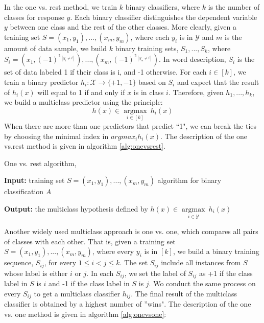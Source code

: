 In the one vs. rest method,   we train $k$ binary classifiers,  where $k$ is the number of classes for response $y$. Each binary classifier distinguishes the dependent variable $y$ between one class and the rest of the other classes.  More clearly,   given a training set  $S=(x_1, y_1), ...,  (x_m, y_m)$,  where each $y_i$ is in $\mathcal{Y}$ and $m$ is the amount of data sample,  we build $k$ binary training sets,  $S_1, ..., S_k$,  where $S_i=(x_1, (-1)^{\mathds{1}_[y_1\neq i]}), ..., (x_m, (-1)^{\mathds{1}_[y_m\neq i]}).$ In word description,  
$S_i$ is the set of data labeled 1 if their class is i,  and -1 otherwise. For each $i \in [k]$,  we train a binary predictor $h_i:\mathcal{X}\rightarrow \{+1, -1\}$ based on $S_i$ and expect that the result of $h_i(x)$ will equal to 1 if and only if $x$ is in class $i$.  Therefore,  given $h_1, ..., h_k$,  we build a multiclass predictor using the principle: 
\begin{equation}
h(x) \in\underset{i\in [k]}{\operatorname{argmax}}\ h_i(x)
\end{equation}
When there are more than one predictors that predict ``1",  we can break the ties by choosing the minimal index in $argmax_i h_i(x)$. The description of the one vs.rest method is given in algorithm \ref{alg:onevsrest}.


\begin{algorithm}[H]
	\caption{One vs. rest algorithm, }  \label{alg:onevsrest}
	\nl \textbf{Input:}\;
	\nl training set $S=(x_1, y_1), ..., (x_m, y_m)$\;
	    algorithm for binary classification $A$\;
	
	\nl \textbf{Output:} \;
	the multiclass hypothesis defined by $h(x)\in  \underset{i\in \mathcal{Y}}{\operatorname{argmax}}\ h_i(x)$\;
\end{algorithm}


Another widely used multiclass approach is one vs. one,  which compares all pairs of classes with each other. That is,  given a training set $S=(x_1, y_1), ..., (x_m, y_m)$,  where every $y_i$ is in $[k]$,  we build a binary training sequence,  $S_{ij}$,  for every $1\leq i <j\leq k$. The set $S_{ij}$ include all instances from $S$ whose label is either $i$ or $j$. In each $S_{ij}$,  we set the label of $S_{ij}$ as +1 if the class label in $S$ is $i$ and -1 if the class label in $S$ is $j$. Wo conduct the same process on every $S_{ij}$ to get a multiclass classifier $h_{ij}$. The final result of the multiclass classifier is obtained by a highest number of ''wins". The description of the one vs. one method is given in algorithm \ref{alg:onevsone}:


